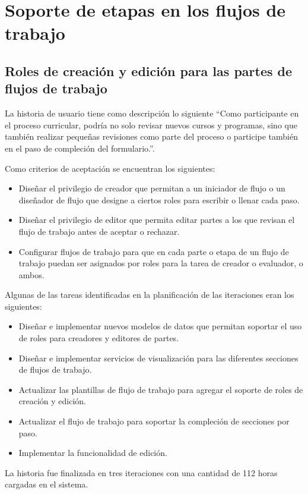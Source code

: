 \section{Soporte de etapas en los flujos de trabajo}
\subsection{Roles de creación y edición para las partes de flujos de trabajo}
La historia de usuario tiene como descripción lo siguiente \enquote{Como participante en el proceso curricular, podría no solo revisar nuevos cursos y programas, sino que también realizar pequeñas revisiones como parte del proceso o participe también en el paso de compleción del formulario.}.

Como criterios de aceptación se encuentran los siguientes:
\begin{itemize}
	\item Diseñar el privilegio de creador que permitan a un iniciador de flujo o un diseñador de flujo que designe a ciertos roles para escribir o llenar cada paso.
	\item Diseñar el privilegio de editor que permita editar partes a los que revisan el flujo de trabajo antes de aceptar o rechazar.
	\item Configurar flujos de trabajo para que en cada parte o etapa de un flujo de trabajo puedan ser asignados por roles para la tarea de creador o evaluador, o ambos.
\end{itemize}

Algunas de las tareas identificadas en la planificación de las iteraciones eran los siguientes:
\begin{itemize}
	\item Diseñar e implementar nuevos modelos de datos que permitan soportar el uso de roles para creadores y editores de partes.
	\item Diseñar e implementar servicios de visualización para las diferentes secciones de flujos de trabajo.
	\item Actualizar las plantillas de flujo de trabajo para agregar el soporte de roles de creación y edición.
	\item Actualizar el flujo de trabajo para soportar la compleción de secciones por paso.
	\item Implementar la funcionalidad de edición.
\end{itemize}

La historia fue finalizada en tres iteraciones con una cantidad de 112 horas cargadas en el sistema.


